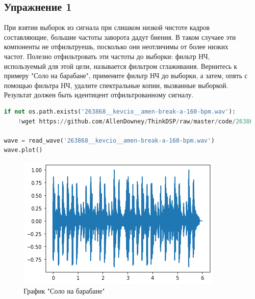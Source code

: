 \subsection{Упражнение 1}

При взятии выборок из сигнала при слишком низкой чистоте кадров составляющие, большие частоты заворота дадут биения. В таком случаее эти компоненты не отфильтруешь, посколько они неотличимы от более низких частот. Полезно отфильтровать эти частоты до выборки: фильтр НЧ, используемый для этой цели, называется фильтром сглаживания. Вернитесь к примеру "Соло на барабане", примените фильтр НЧ до выборки, а затем, опять с помощью фильтра НЧ, удалите спектральные копии, вызванные выборкой. Результат должен быть идентицент отфильтрованному сигналу.

\begin{lstlisting}[language=Python]
if not os.path.exists('263868__kevcio__amen-break-a-160-bpm.wav'):
    !wget https://github.com/AllenDowney/ThinkDSP/raw/master/code/263868__kevcio__amen-break-a-160-bpm.wav
    
wave = read_wave('263868__kevcio__amen-break-a-160-bpm.wav')
wave.plot()
\end{lstlisting}
\begin{figure}[H]
	\begin{center}
		\includegraphics[scale=1]{fig/lab11/lab11_5_0.png}
		\caption{График "Соло на барабане"}
	\end{center}
\end{figure}

